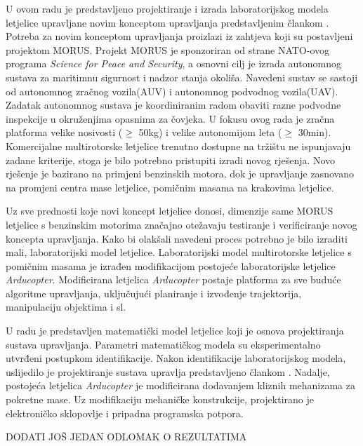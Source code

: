 \documentclass[11pt,a4paper]{article}
\begin{document}
U ovom radu je predstavljeno projektiranje i izrada laboratorijskog modela letjelice upravljane novim konceptom upravljanja predstavljenim člankom \cite{haus1}. Potreba za novim konceptom upravljanja proizlazi iz zahtjeva koji su postavljeni projektom MORUS. Projekt MORUS je sponzoriran od strane NATO-ovog programa \textit{Science for Peace and Security}, a osnovni cilj je izrada autonomnog sustava za maritimnu sigurnost i nadzor stanja okoliša. Navedeni sustav se sastoji od autonomnog zračnog vozila(AUV) i autonomnog podvodnog vozila(UAV). Zadatak autonomnog sustava je koordiniranim radom obaviti razne podvodne inspekcije u okruženjima opasnima za čovjeka. U fokusu ovog rada je zračna platforma velike nosivosti ($\geq$ 50kg) i velike autonomijom leta ($\geq$ 30min).  Komercijalne multirotorske letjelice trenutno dostupne na tržištu ne ispunjavaju zadane kriterije, stoga je bilo potrebno pristupiti izradi novog rješenja. Novo rješenje je bazirano na primjeni benzinskih motora, dok je upravljanje zasnovano na promjeni centra mase letjelice, pomičnim masama na krakovima letjelice.

\medskip

Uz sve prednosti koje novi koncept letjelice donosi, dimenzije same MORUS letjelice s benzinskim motorima značajno otežavaju testiranje i verificiranje novog koncepta upravljanja. Kako bi olakšali navedeni proces potrebno je bilo izraditi mali, laboratorijski model letjelice. Laboratorijski model multirotorske letjelice s pomičnim masama je izrađen modifikacijom postojeće laboratorijske letjelice \textit{Arducopter}. Modificirana letjelica \textit{Arducopter} postaje platforma za sve buduće algoritme upravljanja, uključujući planiranje i izvođenje trajektorija, manipulaciju objektima i sl. 

\medskip
U radu je predstavljen matematički model letjelice koji je osnova projektiranja sustava upravljanja. Parametri matematičkog modela su eksperimentalno utvrđeni postupkom identifikacije. Nakon identifikacije laboratorijskog modela, uslijedilo je projektiranje sustava upravlja predstavljeno člankom \cite{haus2}. Nadalje, postojeća letjelica \textit{Arducopter} je modificirana dodavanjem kliznih mehanizama za pokretne mase. Uz modifikaciju mehaničke konstrukcije, projektirano je elektroničko sklopovlje i pripadna programska potpora. 

\medskip
DODATI JOŠ JEDAN ODLOMAK O REZULTATIMA
\end{document}
